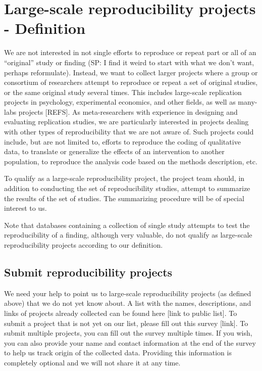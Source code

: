 \documentclass[a4paper,11pt]{report}
\begin{document}
\section*{Large-scale reproducibility projects - Definition}
We are not interested in not single efforts to reproduce or repeat part or all of an ``original'' study or finding (SP: I find it weird to start with what we don't want, perhaps reformulate). Instead, we want to collect larger projects where a group or consortium of researchers attempt to reproduce or repeat a set of original studies, or the same original study several times. This includes large-scale replication projects in psychology, experimental economics, and other fields, as well as many-labs projects [REFS]. As meta-researchers with experience in designing and evaluating replication studies, we are particularly interested in projects dealing with other types of reproducibility that we are not aware of. Such projects could include, but are not limited to, efforts to reproduce the coding of qualitative data, to translate or generalize the effects of an intervention to another population, to reproduce the analysis code based on the methods description, etc.

To qualify as a large-scale reproducibility project, the project team should, in addition to conducting the set of reproducibility studies, attempt to summarize the results of the set of studies. The summarizing procedure will be of special interest to us.

Note that databases containing a collection of single study attempts to test the reproducibility of a finding, although very valuable, do not qualify as large-scale reproducibility projects according to our definition.

\subsection*{Submit reproducibility projects}
We need your help to point us to large-scale reproducibility projects (as defined above) that we do not yet know about. A list with the names, descriptions, and links of projects already collected can be found here [link to public list].
To submit a project that is not yet on our list, please fill out this survey [link]. To submit multiple projects, you can fill out the survey multiple times. If you wish, you can also provide your name and contact information at the end of the survey to help us track origin of the collected data. Providing this information is completely optional and we will not share it at any time.
\end{document}

